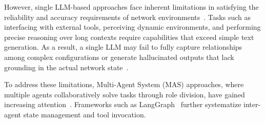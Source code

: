 
However, single LLM-based approaches face inherent limitations in satisfying the reliability and accuracy requirements of network environments~\cite{mondal2023llm_router, wang2025network_arena}.
Tasks such as interfacing with external tools, perceiving dynamic environments, and performing precise reasoning over long contexts require capabilities that exceed simple text generation.
As a result, a single LLM may fail to fully capture relationships among complex configurations or generate hallucinated outputs that lack grounding in the actual network state~\cite{bekri2025bridging, wang2024netconfeval}.

To address these limitations, Multi-Agent System (MAS) approaches, where multiple agents collaboratively solve tasks through role division, have gained increasing attention~\cite{ref2, arzo2021multiagent, bimo2025intentbased}.
Frameworks such as LangGraph~\cite{ref3} further systematize inter-agent state management and tool invocation.




